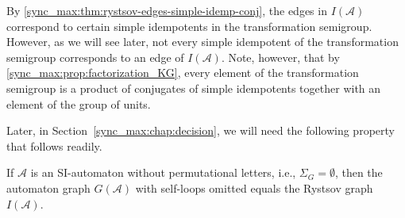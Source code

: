 By \cref{sync_max:thm:rystsov-edges-simple-idemp-conj}, the edges in
$I(\mathcal A)$ correspond to certain simple idempotents in the
transformation semigroup. However, as we will see later, not every
simple idempotent of the transformation semigroup corresponds to an
edge of $I(\mathcal A)$. Note, however, that by
\cref{sync_max:prop:factorization_KG}, every element of the
transformation semigroup is a product of conjugates of simple
idempotents together with an element of the group of units.

Later, in Section~\ref{sync_max:chap:decision}, we will need the following property that follows readily. 

\begin{proposition}
	\label{sync_max:prop:SI-without-permletters}
	If $\mathcal A$ is an SI-automaton without permutational letters, i.e., $\Sigma_G = \emptyset$, then the automaton graph $G(\mathcal A)$ with self-loops omitted equals the Rystsov graph $I(\mathcal A)$.
\end{proposition}